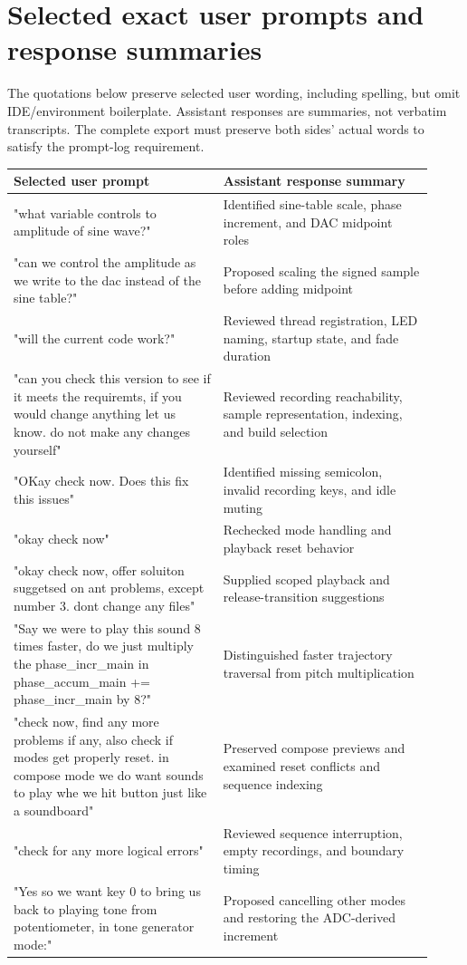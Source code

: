 \documentclass[11pt,letterpaper]{article}
\begin{document}
\section*{Selected exact user prompts and response summaries}

The quotations below preserve selected user wording, including spelling, but omit IDE/environment boilerplate. Assistant responses are summaries, not verbatim transcripts. The complete export must preserve both sides' actual words to satisfy the prompt-log requirement.

\begingroup\small
\setlength{\tabcolsep}{5pt}
\begin{longtable}{|>{\raggedright\arraybackslash}p{0.458\linewidth}|>{\raggedright\arraybackslash}p{0.458\linewidth}|}
\hline
\textbf{Selected user prompt} & \textbf{Assistant response summary} \\ \hline
\endhead
"what variable controls to amplitude of sine wave?" & Identified sine-table scale, phase increment, and DAC midpoint roles \\ \hline
"can we control the amplitude as we write to the dac instead of the sine table?" & Proposed scaling the signed sample before adding midpoint \\ \hline
"will the current code work?" & Reviewed thread registration, LED naming, startup state, and fade duration \\ \hline
"can you check this version to see if it meets the requiremts, if you would change anything let us know. do not make any changes yourself" & Reviewed recording reachability, sample representation, indexing, and build selection \\ \hline
"OKay check now. Does this fix this issues" & Identified missing semicolon, invalid recording keys, and idle muting \\ \hline
"okay check now" & Rechecked mode handling and playback reset behavior \\ \hline
"okay check now, offer soluiton suggetsed on ant problems, except number 3. dont change any files" & Supplied scoped playback and release-transition suggestions \\ \hline
"Say we were to play this sound 8 times faster, do we just multiply the phase\_incr\_main in phase\_accum\_main += phase\_incr\_main by 8?" & Distinguished faster trajectory traversal from pitch multiplication \\ \hline
"check now, find any more problems if any, also check if modes get properly reset. in compose mode we do want sounds to play whe  we hit button just like a soundboard" & Preserved compose previews and examined reset conflicts and sequence indexing \\ \hline
"check for any more logical errors" & Reviewed sequence interruption, empty recordings, and boundary timing \\ \hline
"Yes so we want key 0 to bring us back to playing tone from potentiometer, in tone generator mode:" & Proposed cancelling other modes and restoring the ADC-derived increment \\ \hline
\end{longtable}
\endgroup
\end{document}
